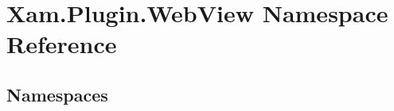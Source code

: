 \hypertarget{namespace_xam_1_1_plugin_1_1_web_view}{}\section{Xam.\+Plugin.\+Web\+View Namespace Reference}
\label{namespace_xam_1_1_plugin_1_1_web_view}
\subsection*{Namespaces}
\begin{DoxyCompactItemize}
\end{DoxyCompactItemize}
